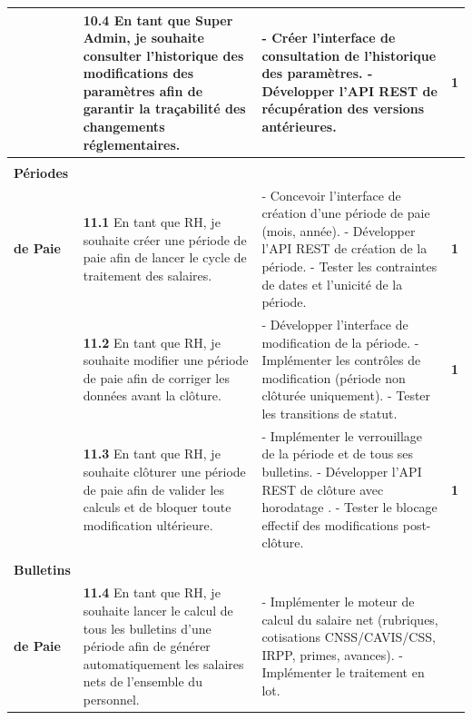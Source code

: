 \begin{small}
\begin{longtable}{|>{\raggedright\arraybackslash}p{2.8cm}|>{\raggedright\arraybackslash}p{6.2cm}|>{\raggedright\arraybackslash}p{6.2cm}|c|}
& \textbf{10.4} En tant que Super Admin, je souhaite consulter l'historique des modifications des paramètres afin de garantir la traçabilité des changements réglementaires.
& - Créer l'interface de consultation de l'historique des paramètres.\newline
- Développer l'API REST de récupération des versions antérieures.
& \textbf{1} \\ \hline

\multirow{3}{*}{\makecell[c]{\textbf{Gestion des}\\ \textbf{Périodes}\\ \textbf{de Paie}}}
& \textbf{11.1} En tant que RH, je souhaite créer une période de paie afin de lancer le cycle de traitement des salaires.
& - Concevoir l'interface de création d'une période de paie (mois, année).\newline
- Développer l'API REST de création de la période.\newline
- Tester les contraintes de dates et l'unicité de la période.
& \textbf{1} \\ \cline{2-4}

& \textbf{11.2} En tant que RH, je souhaite modifier une période de paie afin de corriger les données avant la clôture.
& - Développer l'interface de modification de la période.\newline
- Implémenter les contrôles de modification (période non clôturée uniquement).\newline
- Tester les transitions de statut.
& \textbf{1} \\ \cline{2-4}

& \textbf{11.3} En tant que RH, je souhaite clôturer une période de paie afin de valider les calculs et de bloquer toute modification ultérieure.
& - Implémenter le verrouillage de la période et de tous ses bulletins.\newline
- Développer l'API REST de clôture avec horodatage .\newline
- Tester le blocage effectif des modifications post-clôture.
& \textbf{1} \\ \hline

\multirow{1}{*}{\makecell[c]{\textbf{Calcul des}\\ \textbf{Bulletins}\\ \textbf{de Paie}}}
& \textbf{11.4} En tant que RH, je souhaite lancer le calcul de tous les bulletins d'une période afin de générer automatiquement les salaires nets de l'ensemble du personnel.
& - Implémenter le moteur de calcul du salaire net (rubriques, cotisations CNSS/CAVIS/CSS, IRPP, primes, avances).\newline
- Implémenter le traitement en lot.\newline


\end{longtable}
\end{small}
